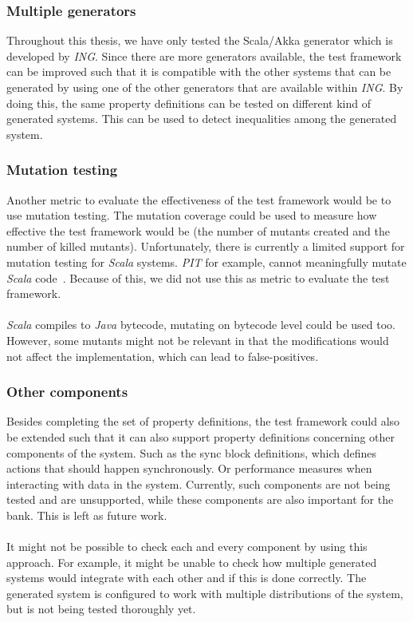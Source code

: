 \subsubsection{Multiple generators}
Throughout this thesis, we have only tested the Scala/Akka generator which is
developed by \textit{ING}. Since there are more generators available, the test
framework can be improved such that it is
compatible with the other systems that can be generated by using one of the
other generators that are available within \textit{ING}. By doing this, the same
property definitions can be tested on different kind of generated systems. This
can be used to detect inequalities among the generated system.

\subsubsection{Mutation testing}
Another metric to evaluate the effectiveness of the test framework would be to use
mutation testing. The mutation coverage could be used to measure how
effective the test framework would be (the number of mutants created and the
number of killed mutants). Unfortunately, there is currently a limited support
for mutation testing for \textit{Scala} systems. \textit{PIT} for example, cannot meaningfully
mutate \textit{Scala} code~\cite{siteSbtPit2017}. Because of this, we did not
use this as metric to evaluate the test framework.\\
\\
\textit{Scala} compiles to \textit{Java} bytecode, mutating on bytecode level
could be used too. However, some mutants might not be relevant in that the
modifications would not affect the implementation, which can lead to
false-positives.

\subsubsection{Other components}
Besides completing the set of property definitions, the test framework could also be extended such that it
can also support property definitions concerning other components of the system. Such as the sync block
definitions, which defines actions that should happen synchronously. Or performance
measures when interacting with data in the system. Currently, such components
are not being tested and are unsupported, while these
components are also important for the bank. This is left as future work.\\
\\
It might not be possible to check each and every component
by using this approach. For example, it might be unable to check how
multiple generated systems would integrate with each other and if this is done
correctly. The generated system is configured to work with multiple
distributions of the system, but is not being tested thoroughly yet.

